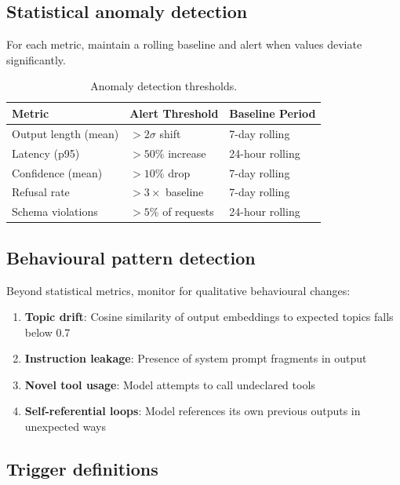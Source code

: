 \documentclass[11pt,a4paper,twoside]{report}
\begin{document}
\subsection{Statistical anomaly detection}

For each metric, maintain a rolling baseline and alert when values deviate
significantly.

\begin{table}[htbp]
\centering
\caption{Anomaly detection thresholds.}
\label{tab:anomaly-thresholds}
\footnotesize
\begin{tabularx}{\linewidth}{@{}l l X@{}}
\toprule
\textbf{Metric} & \textbf{Alert Threshold} & \textbf{Baseline Period} \\ \midrule
Output length (mean) & $>2\sigma$ shift & 7-day rolling \\
Latency (p95) & $>50\%$ increase & 24-hour rolling \\
Confidence (mean) & $>10\%$ drop & 7-day rolling \\
Refusal rate & $>3\times$ baseline & 7-day rolling \\
Schema violations & $>5\%$ of requests & 24-hour rolling \\
\bottomrule
\end{tabularx}
\end{table}

\subsection{Behavioural pattern detection}

Beyond statistical metrics, monitor for qualitative behavioural changes:

\begin{enumerate}
\item \textbf{Topic drift}: Cosine similarity of output embeddings to expected
topics falls below 0.7
\item \textbf{Instruction leakage}: Presence of system prompt fragments in output
\item \textbf{Novel tool usage}: Model attempts to call undeclared tools
\item \textbf{Self-referential loops}: Model references its own previous outputs
in unexpected ways
\end{enumerate}

\subsection{Trigger definitions}
\end{document}
